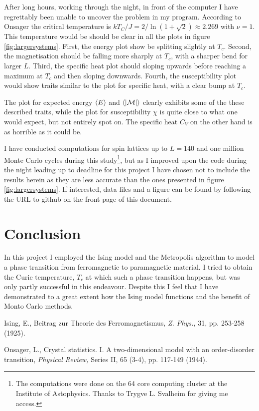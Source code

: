 \documentclass[10pt,a4paper]{amsart}
\begin{document}
After long hours, working through the night, in front of the computer I have regrettably been unable to uncover the problem in my program. According to Onsager \cite{onsager} the critical temperature is $kT_C/J = 2/\ln(1+\sqrt{2}) \approx 2.269$ with $\nu = 1$. This temperature would be should be clear in all the plots in figure \ref{fig:largersystems}. First, the energy plot show be splitting slightly at $T_c$. Second, the magnetisation should be falling more sharply at $T_c$, with a sharper bend for larger $L$. Third, the specific heat plot should sloping upwards before reaching a maximum at $T_c$ and then sloping downwards. Fourth, the susceptibility plot would show traits similar to the plot for specific heat, with a clear bump at $T_c$.

The plot for expected energy $\ev{E}$ and $\ev{\abs{\mathcal{M}}}$ clearly exhibits some of the these described traits, while the plot for susceptibility $\chi$ is quite close to what one would expect, but not entirely spot on. The specific heat $C_V$ on the other hand is as horrible as it could be.

I have conducted computations for spin lattices up to $L=140$ and one million Monte Carlo cycles during this study\footnote{The computations were done on the 64 core computing cluster at the Institute of Astophysics. Thanks to Trygve L. Svalheim for giving me access.}, but as I improved upon the code during the night leading up to deadline for this project I have chosen not to include the results herein as they are less accurate than the ones presented in figure \ref{fig:largersystems}. If interested, data files and a figure can be found by following the URL to github on the front page of this document.

\section{Conclusion}
In this project I employed the Ising model and the Metropolis algorithm to model a phase transition from ferromagnetic to paramagnetic material. I tried to obtain the Curie temperature, $T_c$ at which such a phase transition happens, but was only partly successful in this endeavour. Despite this I feel that I have demonstrated to a great extent how the Ising model functions and the benefit of Monto Carlo methods.

\begin{thebibliography}{9}

 Ising, E., Beitrag zur Theorie des Ferromagnetismus,
	\emph{Z. Phys.,} 31, pp. 253-258 (1925).

 Onsager, L., Crystal statistics. I. A two-dimensional model with an order-disorder transition,
	\emph{Physical Review,} Series II, 65 (3-4), pp. 117-149 (1944).

\end{thebibliography}
\end{document}

